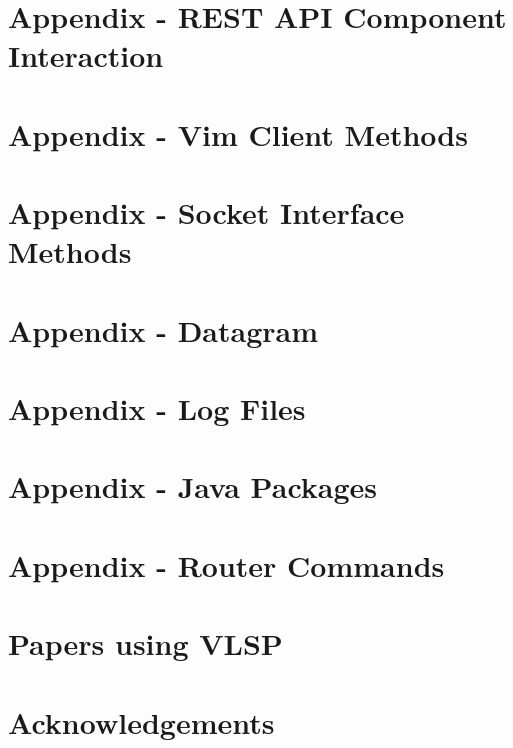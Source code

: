 \documentclass[a4paper, 11pt, twoside]{memoir}
\begin{document}
\chapter{Appendix - REST API Component Interaction}
\label{chap:restapi}


\chapter{Appendix - Vim Client Methods}
\label{chap:vimclient}


\chapter{Appendix - Socket Interface Methods}
\label{chap:methods}


\chapter{Appendix - Datagram} 
\label{chap:datagram}


\chapter{Appendix - Log Files}
\label{chap:logfiles}


\chapter{Appendix - Java Packages}
\label{chap:packages}


\chapter{Appendix - Router Commands}
\label{chap:mcrp}


\chapter{Papers using VLSP}
\label{chap:papers}


\chapter{Acknowledgements}



\backmatter 

\listoffigures

\clearpage
\listoftables

\lstlistoflistings
\end{document}
